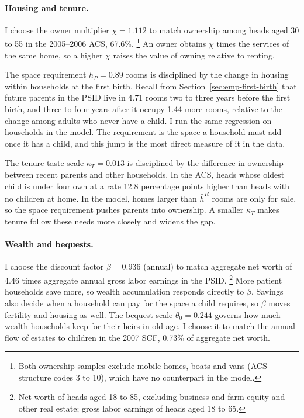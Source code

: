 \paragraph{Housing and tenure.}
I choose the owner multiplier $\chi=1.112$ to match ownership among heads
aged 30 to 55 in the 2005--2006 ACS, 67.6\%.%
\footnote{Both ownership samples exclude mobile homes, boats and vans (ACS
structure codes 3 to 10), which have no counterpart in the model.}
An owner obtains $\chi$ times the services of the same home, so a higher
$\chi$ raises the value of owning relative to renting.

The space requirement $h_P=0.89$ rooms is disciplined by the change in
housing within households at the first birth. Recall from
Section~\ref{sec:emp-first-birth} that future parents in the PSID live in
4.71 rooms two to three years before the first birth, and three to four years
after it occupy 1.44 more rooms, relative to the change among adults who
never have a child. I run the same regression on households in the model.
The requirement is the space a household must add once it has a child, and
this jump is the most direct measure of it in the data.

The tenure taste scale $\kappa_T=0.013$ is disciplined by the difference in
ownership between recent parents and other households. In the ACS, heads
whose oldest child is under four own at a rate
12.8 percentage points higher than heads with no children at home. In the
model, homes larger than $\bar h^R$ rooms are only for sale, so the space
requirement pushes parents into ownership. A smaller $\kappa_T$ makes tenure
follow these needs more closely and widens the gap.

\paragraph{Wealth and bequests.}
I choose the discount factor $\beta=0.936$ (annual) to match aggregate net
worth of 4.46 times aggregate annual gross labor earnings in the PSID.%
\footnote{Net worth of heads aged 18 to 85, excluding business and farm
equity and other real estate; gross labor earnings of heads aged 18 to 65.}
More patient households save more, so wealth accumulation responds
directly to $\beta$. Savings also decide when a household can pay for the space a
child requires, so $\beta$ moves fertility and housing as well. The bequest
scale $\theta_0=0.244$ governs how much wealth households keep for their
heirs in old age. I choose it to match the annual flow of estates to
children in the 2007 SCF, 0.73\% of aggregate net worth.


